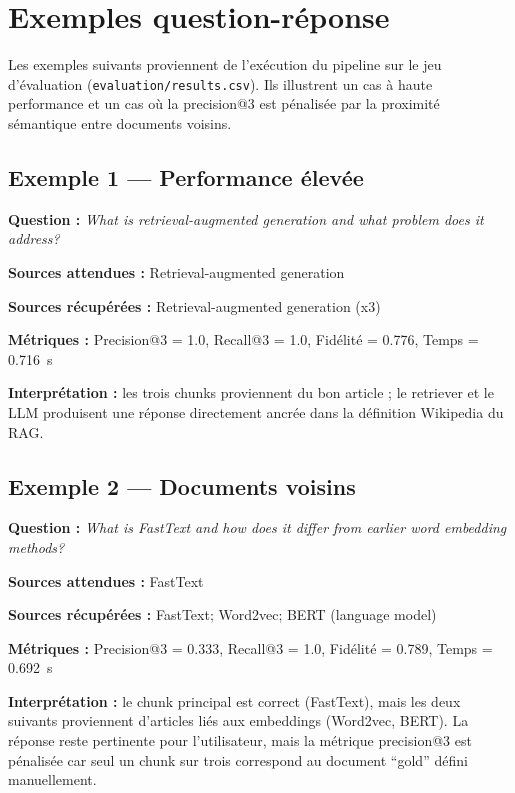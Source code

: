 \section{Exemples question-r\'eponse}
\label{ann:exemples}

Les exemples suivants proviennent de l'ex\'ecution du pipeline sur le jeu d'\'evaluation
(\texttt{evaluation/results.csv}). Ils illustrent un cas \`a haute performance et un cas o\`u la
precision@3 est p\'enalis\'ee par la proximit\'e s\'emantique entre documents voisins.

\subsection{Exemple 1 --- Performance \'elev\'ee}

\textbf{Question :} \emph{What is retrieval-augmented generation and what problem does it address?}

\textbf{Sources attendues :} Retrieval-augmented generation

\textbf{Sources r\'ecup\'er\'ees :} Retrieval-augmented generation (x3)

\textbf{M\'etriques :} Precision@3 = 1.0, Recall@3 = 1.0, Fid\'elit\'e = 0.776, Temps = 0.716~s

\textbf{Interpr\'etation :} les trois chunks proviennent du bon article ; le retriever et le LLM
produisent une r\'eponse directement ancr\'ee dans la d\'efinition Wikipedia du RAG.

\subsection{Exemple 2 --- Documents voisins}

\textbf{Question :} \emph{What is FastText and how does it differ from earlier word embedding methods?}

\textbf{Sources attendues :} FastText

\textbf{Sources r\'ecup\'er\'ees :} FastText; Word2vec; BERT (language model)

\textbf{M\'etriques :} Precision@3 = 0.333, Recall@3 = 1.0, Fid\'elit\'e = 0.789, Temps = 0.692~s

\textbf{Interpr\'etation :} le chunk principal est correct (FastText), mais les deux suivants
proviennent d'articles li\'es aux embeddings (Word2vec, BERT). La r\'eponse reste pertinente pour
l'utilisateur, mais la m\'etrique precision@3 est p\'enalis\'ee car seul un chunk sur trois
correspond au document ``gold'' d\'efini manuellement.

